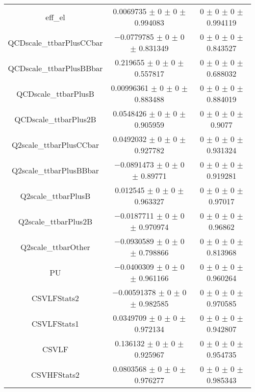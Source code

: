 \begin{table}
\begin{tabular}{ccc}
eff\_el & \num{0.0069735} $\pm$ \num{0} $\pm$ \num{0} $\pm$ \num{0.994083} & \num{0} $\pm$ \num{0} $\pm$ \num{0} $\pm$ \num{0.994119}\\
QCDscale\_ttbarPlusCCbar & \num{-0.0779785} $\pm$ \num{0} $\pm$ \num{0} $\pm$ \num{0.831349} & \num{0} $\pm$ \num{0} $\pm$ \num{0} $\pm$ \num{0.843527}\\
QCDscale\_ttbarPlusBBbar & \num{0.219655} $\pm$ \num{0} $\pm$ \num{0} $\pm$ \num{0.557817} & \num{0} $\pm$ \num{0} $\pm$ \num{0} $\pm$ \num{0.688032}\\
QCDscale\_ttbarPlusB & \num{0.00996361} $\pm$ \num{0} $\pm$ \num{0} $\pm$ \num{0.883488} & \num{0} $\pm$ \num{0} $\pm$ \num{0} $\pm$ \num{0.884019}\\
QCDscale\_ttbarPlus2B & \num{0.0548426} $\pm$ \num{0} $\pm$ \num{0} $\pm$ \num{0.905959} & \num{0} $\pm$ \num{0} $\pm$ \num{0} $\pm$ \num{0.9077}\\
Q2scale\_ttbarPlusCCbar & \num{0.0492032} $\pm$ \num{0} $\pm$ \num{0} $\pm$ \num{0.927782} & \num{0} $\pm$ \num{0} $\pm$ \num{0} $\pm$ \num{0.931324}\\
Q2scale\_ttbarPlusBBbar & \num{-0.0891473} $\pm$ \num{0} $\pm$ \num{0} $\pm$ \num{0.89771} & \num{0} $\pm$ \num{0} $\pm$ \num{0} $\pm$ \num{0.919281}\\
Q2scale\_ttbarPlusB & \num{0.012545} $\pm$ \num{0} $\pm$ \num{0} $\pm$ \num{0.963327} & \num{0} $\pm$ \num{0} $\pm$ \num{0} $\pm$ \num{0.97017}\\
Q2scale\_ttbarPlus2B & \num{-0.0187711} $\pm$ \num{0} $\pm$ \num{0} $\pm$ \num{0.970974} & \num{0} $\pm$ \num{0} $\pm$ \num{0} $\pm$ \num{0.96862}\\
Q2scale\_ttbarOther & \num{-0.0930589} $\pm$ \num{0} $\pm$ \num{0} $\pm$ \num{0.798866} & \num{0} $\pm$ \num{0} $\pm$ \num{0} $\pm$ \num{0.813968}\\
PU & \num{-0.0400309} $\pm$ \num{0} $\pm$ \num{0} $\pm$ \num{0.961166} & \num{0} $\pm$ \num{0} $\pm$ \num{0} $\pm$ \num{0.960264}\\
CSVLFStats2 & \num{-0.00591378} $\pm$ \num{0} $\pm$ \num{0} $\pm$ \num{0.982585} & \num{0} $\pm$ \num{0} $\pm$ \num{0} $\pm$ \num{0.970585}\\
CSVLFStats1 & \num{0.0349709} $\pm$ \num{0} $\pm$ \num{0} $\pm$ \num{0.972134} & \num{0} $\pm$ \num{0} $\pm$ \num{0} $\pm$ \num{0.942807}\\
CSVLF & \num{0.136132} $\pm$ \num{0} $\pm$ \num{0} $\pm$ \num{0.925967} & \num{0} $\pm$ \num{0} $\pm$ \num{0} $\pm$ \num{0.954735}\\
CSVHFStats2 & \num{0.0803568} $\pm$ \num{0} $\pm$ \num{0} $\pm$ \num{0.976277} & \num{0} $\pm$ \num{0} $\pm$ \num{0} $\pm$ \num{0.985343}\\

\end{tabular}
\end{table}
